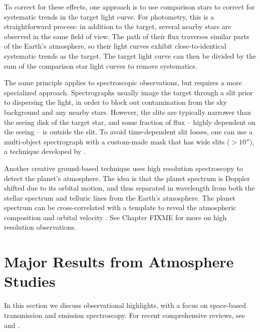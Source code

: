 \documentclass[graybox,natbib,nosecnum]{svmult}
\begin{document}
To correct for these effects, one approach is to use comparison stars to correct for systematic trends in the target light curve. For photometry, this is a straightforward process: in addition to the target, several nearby stars are observed in the same field of view. The path of their flux traverses similar parts of the Earth's atmosphere, so their light curves exhibit close-to-identical systematic trends as the target. The target light curve can then be divided by the sum of the comparison star light curves to remove systematics.  

The same principle applies to spectroscopic observations, but requires a more specialized approach.  Spectrographs usually image the target through a slit prior to dispersing the light, in order to block out contamination from the sky background and any nearby stars. However, the slits are typically narrower than the seeing disk of the target star, and some fraction of flux -- highly dependent on the seeing -- is outside the slit.  To avoid time-dependent slit losses, one can use a multi-object spectrograph with a custom-made mask that has wide slits ($>10''$), a technique developed by \cite{bean10}. 

Another creative ground-based technique uses high resolution spectroscopy to detect the planet's atmosphere.  The idea is that the planet spectrum is Doppler shifted due to its orbital motion, and thus separated in wavelength from both the stellar spectrum and telluric lines from the Earth's atmosphere. The planet spectrum can be cross-correlated with a template to reveal the atmospheric composition and orbital velocity \citep[e.g.][]{snellen10}.  See Chapter FIXME for more on high resolution observations. 


\section{Major Results from Atmosphere Studies}
In this section we discuss observational highlights, with a focus on space-based transmission and emission spectroscopy.  For recent comprehensive reviews, see \cite{crossfield15} and \cite{deming17}. %
\end{document}
